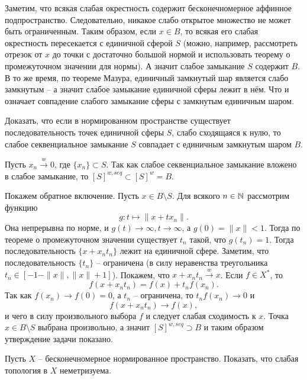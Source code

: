 \begin{solution}
    Заметим, что всякая слабая окрестность содержит бесконечномерное аффинное подпространство.
    Следовательно, никакое слабо открытое множество не может быть ограниченным.
    Таким образом, если $x \in B$, то всякая его слабая окрестность пересекается с единичной сферой $S$ (можно, например, рассмотреть отрезок от $x$ до точки с достаточно большой нормой и использовать теорему о промежуточном значении для нормы).
    А значит слабое замыкание $S$ содержит $B$.
    В то же время, по теореме Мазура, единичный замкнутый шар является слабо замкнутым -- а значит слабое замыкание единичной сферы лежит в нём.
    Что и означает совпадение слабого замыкание сферы с замкнутым единичным шаром.
\end{solution}
\begin{task}[T3]
    Доказать, что если в нормированном пространстве существует последовательность точек единичной сферы $S$, слабо сходящаяся к нулю, то слабое секвенциальное замыкание $S$ совпадает с единичным замкнутым шаром $B$.
\end{task}
\begin{solution}
    Пусть $x_n \xrightarrow{w} 0$, где $\{x_n\} \subset S$.
    Так как слабое секвенциальное замыкание вложено в слабое замыкание, то $[S]^{w, seq} \subset [S]^{w} = B$.

    Покажем обратное включение.
    Пусть $x \in B \setminus S$.
    Для всякого $n \in \mathbb{N}$ рассмотрим функцию
    \[
        g\colon t \mapsto \|x + t x_n\|.
    \]
    Она непрерывна по норме, и $g(t) \rightarrow \infty, t \rightarrow \infty$, а $g(0) = \|x\| < 1$.
    Тогда по теореме о промежуточном значении существует $t_n$ такой, что $g(t_n) = 1$.
    Тогда последовательность $\{x + x_n t_n\}$ лежит на единичной сфере.
    Заметим, что последовательность $\{t_n\}$ -- ограничена (в силу неравенства треугольника $t_n \in [-1 - \|x\|, \|x\| + 1]$).
    Покажем, что $x + x_n t_n \xrightarrow{w} x$.
    Если $f \in X^*$, то
    \[
        f(x + x_n t_n) = f(x) + t_n f(x_n).
    \]
    Так как $f(x_n) \rightarrow f(0) = 0$, а $t_n$ -- ограничена, то $t_n f(x_n) \rightarrow 0$ и
    \[
        f(x + x_n t_n) \rightarrow f(x),
    \]
    и чего в силу произвольного выбора $f$ и следует слабая сходимость к $x$.
    Точка $x \in B \setminus S$ выбрана произвольно, а значит $[S]^{w, seq} \supset B$ и таким образом утверждение задачи показано.
\end{solution}
\begin{task}[T4]
    Пусть $X$ -- бесконечномерное нормированное пространство.
    Показать, что слабая топология в $X$ неметризуема.
\end{task}
